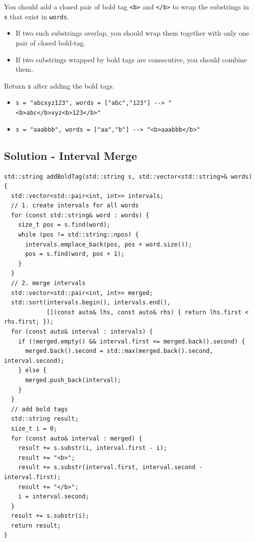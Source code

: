 You should add a closed pair of bold tag {\colorbox{CodeBackground}{\lstinline|<b>|}} and {\colorbox{CodeBackground}{\lstinline|</b>|}} to wrap the substrings in {\colorbox{CodeBackground}{\lstinline|s|}} that exist in {\colorbox{CodeBackground}{\lstinline|words|}}.

\begin{itemize}
\item If two such substrings overlap, you should wrap them together with only one pair of closed bold-tag.
\item If two substrings wrapped by bold tags are consecutive, you should combine them.
\end{itemize}

Return {\colorbox{CodeBackground}{\lstinline|s|}} after adding the bold tags.\\

\begin{itemize}
\item {\colorbox{CodeBackground}{\lstinline|s = "abcxyz123", words = ["abc","123"] --> "<b>abc</b>xyz<b>123</b>"|}}
\item {\colorbox{CodeBackground}{\lstinline|s = "aaabbb", words = ["aa","b"] --> "<b>aaabbb</b>"|}}
\end{itemize}

\subsection*{Solution - Interval Merge}
\begin{lstlisting}
std::string addBoldTag(std::string s, std::vector<std::string>& words) {
  std::vector<std::pair<int, int>> intervals;
  // 1. create intervals for all words
  for (const std::string& word : words) {
    size_t pos = s.find(word);
    while (pos != std::string::npos) {
      intervals.emplace_back(pos, pos + word.size());
      pos = s.find(word, pos + 1);
    }
  }
  // 2. merge intervals
  std::vector<std::pair<int, int>> merged;
  std::sort(intervals.begin(), intervals.end(),
            [](const auto& lhs, const auto& rhs) { return lhs.first < rhs.first; });
  for (const auto& interval : intervals) {
    if (!merged.empty() && interval.first <= merged.back().second) {
      merged.back().second = std::max(merged.back().second, interval.second);
    } else {
      merged.push_back(interval);
    }
  }
  // add bold tags
  std::string result;
  size_t i = 0;
  for (const auto& interval : merged) {
    result += s.substr(i, interval.first - i);
    result += "<b>";
    result += s.substr(interval.first, interval.second - interval.first);
    result += "</b>";
    i = interval.second;
  }
  result += s.substr(i);
  return result;
}
\end{lstlisting}

